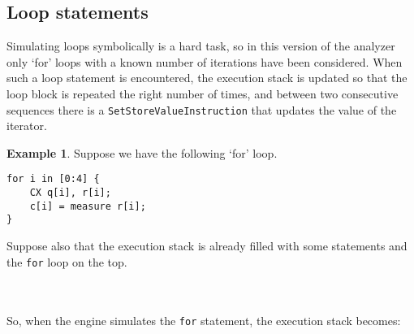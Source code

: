 \documentclass[12pt,a4paper]{report}
\theoremstyle{definition}
\theoremstyle{definition}
\newtheorem{example}{Example}[section]
\theoremstyle{definition}
\begin{document}
\subsection{Loop statements}
Simulating loops symbolically is a hard task, so in this version of the analyzer only `for' loops with a known number of iterations have been considered. When such a loop statement is encountered, the execution stack is updated so that the loop block is repeated the right number of times, and between two consecutive sequences there is a \texttt{SetStoreValueInstruction} that updates the value of the iterator.
\begin{example}
Suppose we have the following `for' loop.
\begin{lstlisting}
for i in [0:4] {
    CX q[i], r[i];
    c[i] = measure r[i];
}
\end{lstlisting}
Suppose also that the execution stack is already filled with some statements and the \texttt{for} loop on the top.\\
\\
\\
So, when the engine simulates the \texttt{for} statement, the execution stack becomes:\\
\\
\end{example}
\end{document}

